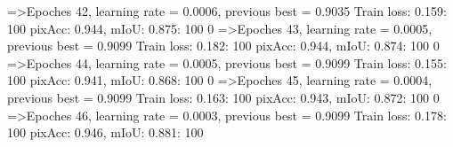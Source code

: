 =>Epoches 42, learning rate = 0.0006,                 previous best = 0.9035
Train loss: 0.159: 100%
pixAcc: 0.944, mIoU: 0.875: 100%
  0%
=>Epoches 43, learning rate = 0.0005,                 previous best = 0.9099
Train loss: 0.182: 100%
pixAcc: 0.944, mIoU: 0.874: 100%
  0%
=>Epoches 44, learning rate = 0.0005,                 previous best = 0.9099
Train loss: 0.155: 100%
pixAcc: 0.941, mIoU: 0.868: 100%
  0%
=>Epoches 45, learning rate = 0.0004,                 previous best = 0.9099
Train loss: 0.163: 100%
pixAcc: 0.943, mIoU: 0.872: 100%
  0%
=>Epoches 46, learning rate = 0.0003,                 previous best = 0.9099
Train loss: 0.178: 100%
pixAcc: 0.946, mIoU: 0.881: 100%
